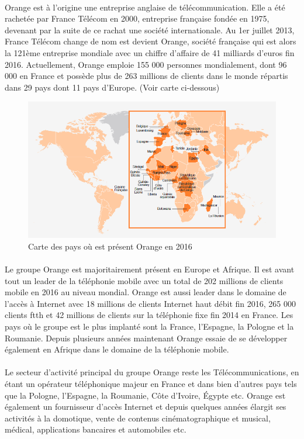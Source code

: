 \documentclass[12pt,a4paper]{report}
\begin{document}
\paragraph*{}
Orange est à l’origine une entreprise anglaise de télécommunication. Elle a été rachetée par France Télécom en 2000, entreprise française fondée en 1975, devenant par la suite de ce rachat une société internationale. Au 1er juillet 2013, France Télécom change de nom est devient Orange, société française qui est alors la 121ème entreprise mondiale avec un chiffre d’affaire de 41 milliards d’euros fin 2016. Actuellement, Orange emploie 155 000 personnes mondialement, dont 96 000 en France et possède plus de 263 millions de clients dans le monde répartis dans 29 pays dont 11 pays d’Europe. (Voir carte ci-dessous)
\begin{figure}[!ht]
    \center
    \includegraphics[scale=0.75]{./img/world_orange_2016.PNG}
    \caption{Carte des pays où est présent Orange en 2016}
\end{figure}
\paragraph*{}
Le groupe Orange est majoritairement présent en Europe et Afrique. Il est avant tout un leader de la téléphonie mobile avec un total de 202 millions de clients mobile en 2016 au niveau mondial. Orange est aussi leader dans le domaine de l’accès à Internet avec 18 millions de clients Internet haut débit fin 2016, 265 000 clients \gls{ftth} et 42 millions de clients sur la téléphonie fixe fin 2014 en France. Les pays où le groupe est le plus implanté sont la France, l’Espagne, la Pologne et la Roumanie. Depuis plusieurs années maintenant Orange essaie de se développer également en Afrique dans le domaine de la téléphonie mobile.
\paragraph*{}
Le secteur d’activité principal du groupe Orange reste les Télécommunications, en étant un opérateur téléphonique majeur en France et dans bien d’autres pays tels que la Pologne, l’Espagne, la Roumanie, Côte d’Ivoire, Égypte etc. Orange est également un fournisseur d’accès Internet et depuis quelques années élargit ses activités à la domotique, vente de contenus cinématographique et musical, médical, applications bancaires et automobiles etc.
\end{document}
